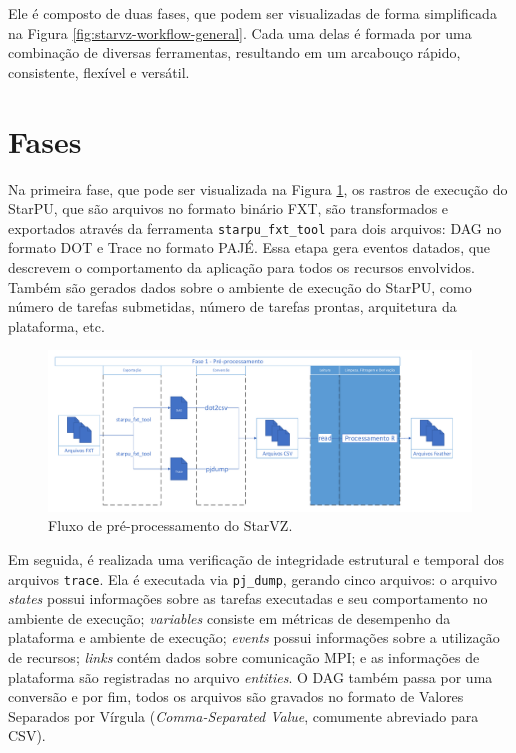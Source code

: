 Ele é composto de duas fases, que podem ser visualizadas de forma simplificada na Figura \ref{fig:starvz-workflow-general}.
Cada uma delas é formada por uma combinação de diversas ferramentas, resultando em um 
arcabouço rápido, consistente, flexível e versátil.

\section{Fases}\label{sect:starvz-phases}

Na primeira fase, que pode ser visualizada na Figura \ref{fig:starvz-workflow1}, 
os rastros de execução do StarPU, que são arquivos no formato binário FXT, são 
transformados e exportados através da ferramenta \texttt{starpu\_fxt\_tool} para 
dois arquivos: DAG no formato DOT e Trace no formato PAJÉ. Essa etapa gera 
eventos datados, que descrevem o comportamento da aplicação para todos os 
recursos envolvidos. Também são gerados dados sobre o ambiente de execução do 
StarPU, como número de tarefas submetidas, número de tarefas prontas, 
arquitetura da plataforma, etc.

\begin{figure}[ht]
 \centerline{\includegraphics[width=1\textwidth]{./img/step1-simpler.pdf}}
 \caption{Fluxo de pré-processamento do StarVZ.}
 \label{fig:starvz-workflow1}
\end{figure}

Em seguida, é realizada uma verificação de integridade estrutural e temporal dos
arquivos \texttt{trace}. Ela é executada via \texttt{pj\_dump}, gerando cinco 
arquivos: o arquivo \textit{states} possui informações sobre as tarefas 
executadas e seu  comportamento no ambiente de execução; \textit{variables}
consiste em métricas de desempenho da plataforma e ambiente de execução; 
\textit{events} possui informações sobre a utilização de recursos; 
\textit{links} contém dados sobre comunicação MPI; e as informações de 
plataforma são registradas no arquivo \textit{entities}. O DAG também passa por 
uma conversão e por fim, todos os arquivos são gravados no formato de Valores 
Separados por Vírgula (\emph{Comma-Separated Value}, comumente abreviado para 
CSV).

